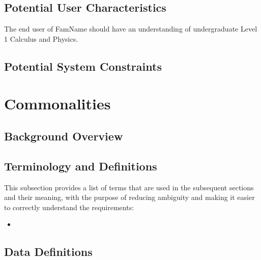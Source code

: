 \documentclass[12pt]{article}
\newcommand{\famname}{FamName} %
\begin{document}
\subsection{Potential User Characteristics} \label{SecUserCharacteristics}

The end user of \famname{} should have an understanding of undergraduate Level 1 Calculus and
Physics.

\subsection{Potential System Constraints}




\section{Commonalities}

\subsection{Background Overview} \label{Sec_Background}

\subsection{Terminology and  Definitions}

This subsection provides a list of terms that are used in the subsequent sections and their
meaning, with the purpose of reducing ambiguity and making it easier to correctly understand the
requirements:

\begin{itemize}

  \item

\end{itemize}

\subsection{Data Definitions} \label{sec_datadef}
\end{document}
